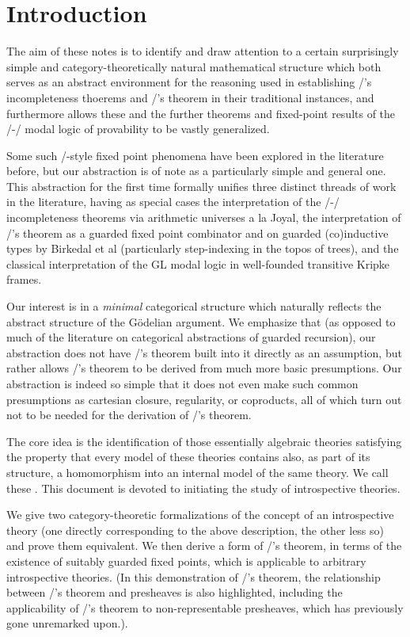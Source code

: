 \filestart

\section{Introduction}
The aim of these notes is to identify and draw attention to a certain surprisingly simple and category-theoretically natural mathematical structure which both serves as an abstract environment for the reasoning used in establishing \Goedel/'s incompleteness thoerems and \Loeb/'s theorem in their traditional instances, and furthermore allows these and the further theorems and fixed-point results of the \Goedel/-\Loeb/ modal logic of provability to be vastly generalized.

Some such \Loeb/-style fixed point phenomena have been explored in the literature before, but our abstraction is of note as a particularly simple and general one. This abstraction for the first time formally unifies three distinct threads of work in the literature, having as special cases the interpretation of the \Goedel/-\Loeb/ incompleteness theorems via arithmetic universes a la Joyal, the interpretation of \Loeb/'s theorem as a guarded fixed point combinator and on guarded (co)inductive types by Birkedal et al (particularly step-indexing in the topos of trees), and the classical interpretation of the GL modal logic in well-founded transitive Kripke frames.

Our interest is in a \emph{minimal} categorical structure which naturally reflects the abstract structure of the G\"odelian argument. We emphasize that (as opposed to much of the literature on categorical abstractions of guarded recursion), our abstraction does not have \Loeb/'s theorem built into it directly as an assumption, but rather allows \Loeb/'s theorem to be derived from much more basic presumptions. Our abstraction is indeed so simple that it does not even make such common presumptions as cartesian closure, regularity, or coproducts, all of which turn out not to be needed for the derivation of \Loeb/'s theorem.

The core idea is the identification of those essentially algebraic theories satisfying the property that every model of these theories contains also, as part of its structure, a homomorphism into an internal model of the same theory. We call these . This document is devoted to initiating the study of introspective theories.

We give two category-theoretic formalizations of the concept of an introspective theory (one directly corresponding to the above description, the other less so) and prove them equivalent. We then derive a form of \Loeb/'s theorem, in terms of the existence of suitably guarded fixed points, which is applicable to arbitrary introspective theories. (In this demonstration of \Loeb/'s theorem, the relationship between \Loeb/'s theorem and presheaves is also highlighted, including the applicability of \Loeb/'s theorem to non-representable presheaves, which has previously gone unremarked upon.).


